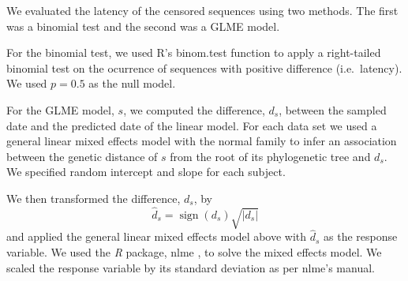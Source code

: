 \documentclass[12pt]{article}
\begin{document}
%
%
%

We evaluated the latency of the censored sequences using two methods. The first was a {binomial test} and the second was a {GLME model}.

For the {binomial test}, we used R's binom.test function to apply a right-tailed binomial test on the ocurrence of sequences with positive difference (i.e.~latency). We used $p=0.5$ as the null model.

For the {GLME model}, $s$, we computed the difference, $d_s$, between the sampled date and the predicted date of the linear model. For each data set we used a general linear mixed effects model with the normal family to infer an association between the genetic distance of $s$ from the root of its phylogenetic tree and $d_s$. We specified random intercept and slope for each subject.

We then transformed the difference, $d_s$, by
\[\hat{d}_s = \operatorname{sign}(d_s)\sqrt{|d_s|}\]
and applied the general linear mixed effects model above with $\hat{d}_s$ as the response variable. We used the \textit{R} package, nlme \citep{NLME}, to solve the mixed effects model. We scaled the response variable by its standard deviation as per nlme's manual.
\end{document}
